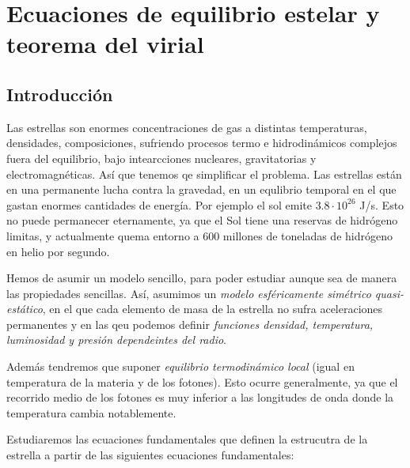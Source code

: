 

\section{Ecuaciones de equilibrio estelar y teorema del virial}

\subsection{Introducción}

Las estrellas son enormes concentraciones de gas a distintas temperaturas, densidades, composiciones, sufriendo procesos termo e hidrodinámicos complejos fuera del equilibrio, bajo intearcciones nucleares, gravitatorias y electromagnéticas. Así que tenemos qe simplificar el problema. Las estrellas están en una permanente lucha contra la gravedad, en un equlibrio temporal en el que gastan enormes cantidades de energía. Por ejemplo el sol emite $3.8 \cdot 10^{26}$ J/s. Esto no puede permanecer eternamente, ya que el Sol tiene una reservas de hidrógeno limitas, y actualmente quema entorno a 600 millones de toneladas de hidrógeno en helio por segundo.

Hemos de asumir un modelo sencillo, para poder estudiar aunque sea de manera las propiedades sencillas. Así, asumimos un \textit{modelo esféricamente simétrico quasi-estático}, en el que cada elemento de masa de la estrella no sufra aceleraciones permanentes y en las qeu podemos definir \textit{funciones densidad, temperatura, luminosidad y presión dependeintes del radio}.

Además tendremos que suponer \textit{equilibrio termodinámico local} (igual en temperatura de la materia y de los fotones). Esto ocurre generalmente, ya que el recorrido medio de los fotones es muy inferior a las longitudes de onda donde la temperatura cambia notablemente.

Estudiaremos las ecuaciones fundamentales que definen la estrucutra de la estrella a partir de las siguientes ecuaciones fundamentales:

